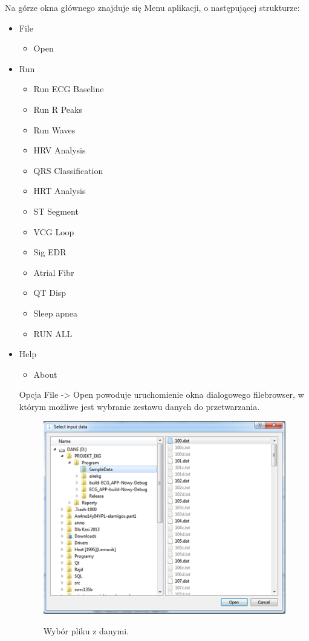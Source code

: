 Na górze okna głównego znajduje się Menu aplikacji, o następującej strukturze:

\begin{itemize}
\item File
\begin{itemize}
\item Open
\end{itemize}
\item Run
\begin{itemize}
\item Run ECG Baseline
\item Run R Peaks
\item Run Waves
\item HRV Analysis
\item QRS Classification
\item HRT Analysis
\item ST Segment
\item VCG Loop
\item Sig EDR
\item Atrial Fibr
\item QT Disp
\item Sleep apnea
\item RUN ALL
\end{itemize}
\item Help
\begin{itemize}
\item About
\end{itemize}

Opcja File -> Open powoduje uruchomienie okna dialogowego filebrowser, w którym możliwe jest wybranie zestawu danych do przetwarzania.

\begin{figure}[H]
\centering
\includegraphics[width=\textwidth]{GUI/img/file_b}
\label{fig:file_b}
\caption{Wybór pliku z danymi.}
\end{figure}


\end{itemize}
